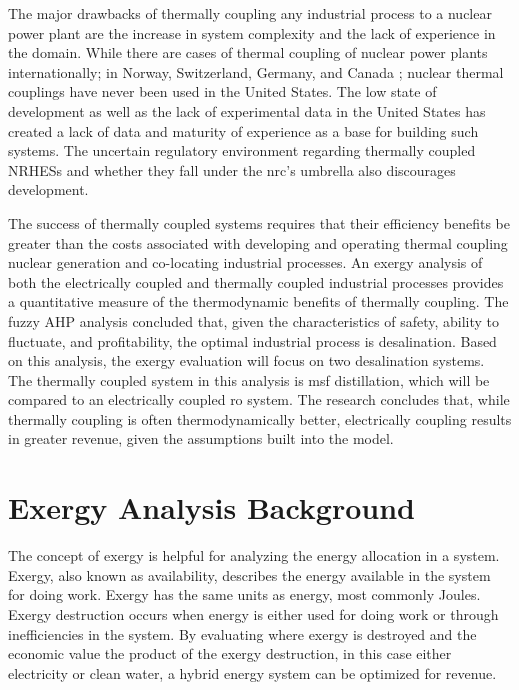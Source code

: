 The major drawbacks of thermally coupling any industrial process to a nuclear power plant are the increase in system complexity and the lack of experience in the domain. While there are cases of thermal coupling of nuclear power plants internationally; in Norway, Switzerland, Germany, and Canada \cite{Verfondern};  nuclear thermal couplings have never been used in the United States.  The low state of development as well as the lack of experimental data in the United States has created a lack of data and maturity of experience as a base for building such systems.  The uncertain regulatory environment regarding thermally coupled NRHESs and whether they fall under the \ac{nrc}'s umbrella also discourages development. 

The success of thermally coupled systems requires that their efficiency benefits be greater than the costs associated with developing and operating thermal coupling nuclear generation and co-locating industrial processes.  An exergy analysis of both the electrically coupled and thermally coupled industrial processes provides a quantitative measure of the thermodynamic benefits of thermally coupling. The fuzzy AHP analysis concluded that, given the characteristics of safety, ability to fluctuate, and profitability, the optimal industrial process is desalination. Based on this analysis, the exergy evaluation will focus on two desalination systems.  The thermally coupled system in this analysis is \ac{msf} distillation, which will be compared to an electrically coupled \ac{ro} system. The research concludes that, while thermally coupling is often thermodynamically better, electrically coupling results in greater revenue, given the assumptions built into the model.  

\section{Exergy Analysis Background}
% 
% 
The concept of exergy is helpful for analyzing the energy allocation in a system. Exergy, also known as availability, describes the energy available in the system for doing work. Exergy has the same units as energy, most commonly Joules. Exergy destruction occurs when energy is either used for doing work or through inefficiencies in the system.  By evaluating where exergy is destroyed and the economic value the product of the exergy destruction, in this case either electricity or clean water, a hybrid energy system can be optimized for revenue. 

